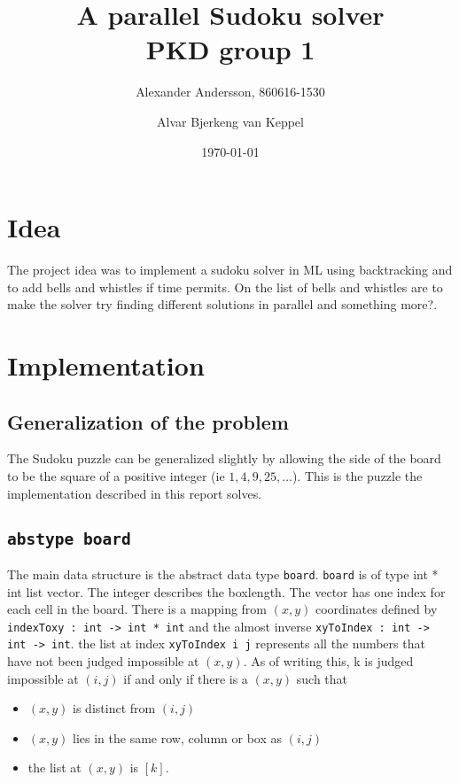 \documentclass[12pt, a4paper]{article}
\title{A parallel Sudoku solver\\\small{PKD group 1}}
\author{Alexander Andersson, 860616-1530 \and Alvar Bjerkeng van Keppel}
\date{\today}
\begin{document}
\maketitle

\begin{abstract}

\end{abstract}

\tableofcontents

\section{Idea}

The project idea was to implement a sudoku solver in ML using backtracking and to add bells and whistles if time permits. On the list of bells and whistles are to make the solver try finding different solutions in parallel and {\color{red}something more?}.


\section{Implementation}

\subsection{Generalization of the problem}

The Sudoku puzzle can be generalized slightly by allowing the side of the board to be the square of a positive integer (ie $1, 4, 9, 25, \dots$). This is the puzzle the implementation described in this report solves.

\subsection{\texttt{abstype board}}
The main data structure is the abstract data type \texttt{board}. \texttt{board} is of type int * int list vector. The integer describes the boxlength. The vector has one index for each cell in the board. There is a mapping from $(x,y)$ coordinates defined by \texttt{indexToxy : int -> int * int} and the almost inverse \texttt{xyToIndex : int -> int -> int}. the list at index \texttt{xyToIndex i j} represents all the numbers that have not been judged impossible at $(x,y)$. As of writing this, k is judged impossible at $(i,j)$ if and only if there is a $(x,y)$ such that
\begin{itemize}
\item $(x,y)$ is distinct from $(i,j)$
\item $(x,y)$ lies in the same row, column or box as $(i,j)$
\item the list at $(x,y)$ is $[k]$.
\end{itemize}
\end{document}
